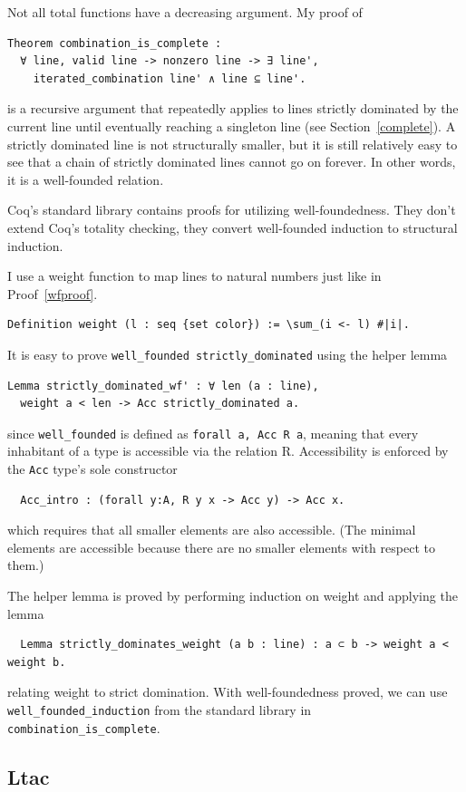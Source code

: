 \documentclass[english, 12pt, a4paper, sci, a-1b, online]{aaltothesis}
\newcommand\icoq[1]{\texttt{#1}}
\begin{document}
Not all total functions have a decreasing argument. My proof of
\begin{verbatim}
Theorem combination_is_complete :
  ∀ line, valid line -> nonzero line -> ∃ line',
    iterated_combination line' ∧ line ⊆ line'.
\end{verbatim}
is a recursive argument that repeatedly applies to lines strictly dominated by the current line until eventually reaching a singleton line (see Section~\ref{complete}). A strictly dominated line is not structurally smaller, but it is still relatively easy to see that a chain of strictly dominated lines cannot go on forever. In other words, it is a well-founded relation.

Coq's standard library contains proofs for utilizing well-foundedness. They don't extend Coq's totality checking, they convert well-founded induction to structural induction.

I use a weight function to map lines to natural numbers just like in Proof~\ref{wfproof}.
\begin{verbatim}
Definition weight (l : seq {set color}) := \sum_(i <- l) #|i|.
\end{verbatim}
It is easy to prove \icoq{well_founded strictly_dominated} using the helper lemma
\begin{verbatim}
Lemma strictly_dominated_wf' : ∀ len (a : line),
  weight a < len -> Acc strictly_dominated a.
\end{verbatim}
since \icoq{well_founded} is defined as \icoq{forall a, Acc R a}, meaning that every inhabitant of a type is accessible via the relation R. Accessibility is enforced by the \icoq{Acc} type's sole constructor
\begin{verbatim}
  Acc_intro : (forall y:A, R y x -> Acc y) -> Acc x.
\end{verbatim}
which requires that all smaller elements are also accessible. (The minimal elements are accessible because there are no smaller elements with respect to them.)

The helper lemma is proved by performing induction on weight and applying the lemma
\begin{verbatim}
  Lemma strictly_dominates_weight (a b : line) : a ⊂ b -> weight a < weight b.
\end{verbatim}
relating weight to strict domination. With well-foundedness proved, we can use \icoq{well_founded_induction} from the standard library in \icoq{combination_is_complete}.

\subsection{Ltac}\label{ltac}
\end{document}

